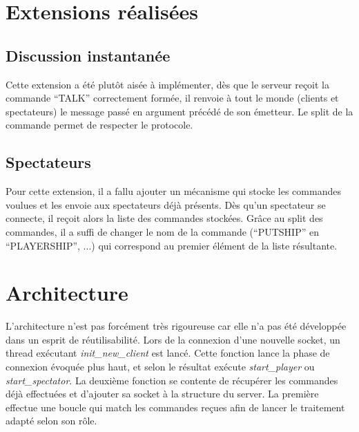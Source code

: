 \documentclass[a4paper, 11pt]{report}
\begin{document}
\section{Extensions réalisées}

\subsection{Discussion instantanée}

Cette extension a été plutôt aisée à implémenter, dès que le serveur reçoit la commande ``TALK'' correctement formée, il renvoie à tout le monde (clients et spectateurs) le message passé en argument précédé de son émetteur. Le split de la commande permet de respecter le protocole.

\subsection{Spectateurs}

Pour cette extension, il a fallu ajouter un mécanisme qui stocke les commandes voulues et les envoie aux spectateurs déjà présents. Dès qu'un spectateur se connecte, il reçoit alors la liste des commandes stockées. Grâce au split des commandes, il a suffi de changer le nom de la commande (``PUTSHIP'' en ``PLAYERSHIP'', ...) qui correspond au premier élément de la liste résultante.

\section{Architecture}

L'architecture n'est pas forcément très rigoureuse car elle n'a pas
été développée dans un esprit de réutilisabilité. Lors de la connexion
d'une nouvelle socket, un thread exécutant \emph{init\_new\_client}
est lancé. Cette fonction lance la phase de connexion évoquée plus
haut, et selon le résultat exécute \emph{start\_player} ou
\emph{start\_spectator}. La deuxième fonction se contente de récupérer 
les commandes déjà effectuées et d'ajouter sa socket à la structure du
server. La première effectue une boucle qui match les commandes reçues
afin de lancer le traitement adapté selon son rôle.
\end{document}
